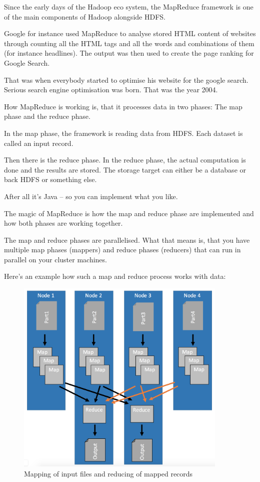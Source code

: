 \documentclass[12pt, numbers=noenddot]{scrreprt} %
\begin{document}
Since the early days of the Hadoop eco system, the MapReduce framework is one of the main components of Hadoop alongside HDFS.

Google for instance used MapReduce to analyse stored HTML content of websites through counting all the HTML tags and all the words and combinations of them (for instance headlines). The output was then used to create the page ranking for Google Search.

That was when everybody started to optimise his website for the google search. Serious search engine optimisation was born. That was the year 2004.

How MapReduce is working is, that it processes data in two phases: The map phase and the reduce phase.

In the map phase, the framework is reading data from HDFS. Each dataset is called an input record.

Then there is the reduce phase. In the reduce phase, the actual computation is done and the results are stored. The storage target can either be a database or back HDFS or something else.

After all it’s Java – so you can implement what you like.

The magic of MapReduce is how the map and reduce phase are implemented and how both phases are working together.

The map and reduce phases are parallelised. What that means is, that you have multiple map phases (mappers) and reduce phases (reducers) that can run in parallel on your cluster machines.

Here's an example how such a map and reduce process works with data:

\begin{figure}[htbp]
  \centering
     \includegraphics[width=0.9\textwidth]{images/MapReduce-Process-Detailed.png}
  \caption{Mapping of input files and reducing of mapped records}
  \label{fig:Bild1}
\end{figure}
\end{document}
